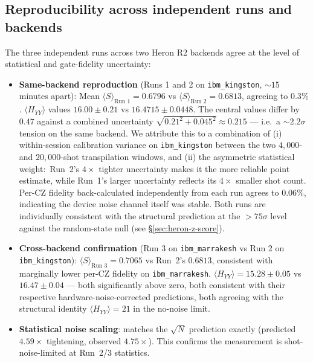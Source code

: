 \documentclass[11pt]{article}
\begin{document}
\subsection{Reproducibility across independent runs and backends}
\label{sec:heron-reproducibility}

The three independent runs across two Heron R2 backends agree at
the level of statistical and gate-fidelity uncertainty:

\begin{itemize}
\item \textbf{Same-backend reproduction} (Runs 1 and 2 on
  \texttt{ibm\_kingston}, $\sim 15$ minutes apart):  Mean
  $\langle S\rangle_{\text{Run 1}} = 0.6796$ vs
  $\langle S\rangle_{\text{Run 2}} = 0.6813$, agreeing to $0.3\%$.
  $\langle H_{YY}\rangle$ values $16.00 \pm 0.21$ vs
  $16.4715 \pm 0.0448$.  The central values differ by $0.47$
  against a combined uncertainty
  $\sqrt{0.21^2 + 0.045^2} \approx 0.215$ — i.e.\ a
  $\sim 2.2\sigma$ tension on the same backend.
  We attribute this to a combination of (i) within-session
  calibration variance on \texttt{ibm\_kingston} between the two
  $4{,}000$- and $20{,}000$-shot transpilation windows, and (ii)
  the asymmetric statistical weight:\ Run~2's $4\times$ tighter
  uncertainty makes it the more reliable point estimate, while
  Run~1's larger uncertainty reflects its $4\times$ smaller
  shot count.  Per-CZ fidelity back-calculated independently from
  each run agrees to $0.06\%$, indicating the device noise
  channel itself was stable.  Both runs are individually
  consistent with the structural prediction at the
  $> 75\sigma$ level against the random-state null (see
  \S\ref{sec:heron-z-score}).
\item \textbf{Cross-backend confirmation} (Run 3 on
  \texttt{ibm\_marrakesh} vs Run 2 on \texttt{ibm\_kingston}):
  $\langle S\rangle_{\text{Run 3}} = 0.7065$ vs Run~2's $0.6813$,
  consistent with marginally lower per-CZ fidelity on
  \texttt{ibm\_marrakesh}.  $\langle H_{YY}\rangle = 15.28 \pm 0.05$
  vs $16.47 \pm 0.04$ — both significantly above zero, both
  consistent with their respective hardware-noise-corrected
  predictions, both agreeing with the structural identity
  $\langle H_{YY}\rangle = 21$ in the no-noise limit.
\item \textbf{Statistical noise scaling}:  matches the
  $\sqrt{N}$ prediction exactly (predicted $4.59\times$
  tightening, observed $4.75\times$).  This confirms the
  measurement is shot-noise-limited at Run~2/3 statistics.
\end{itemize}
\end{document}

